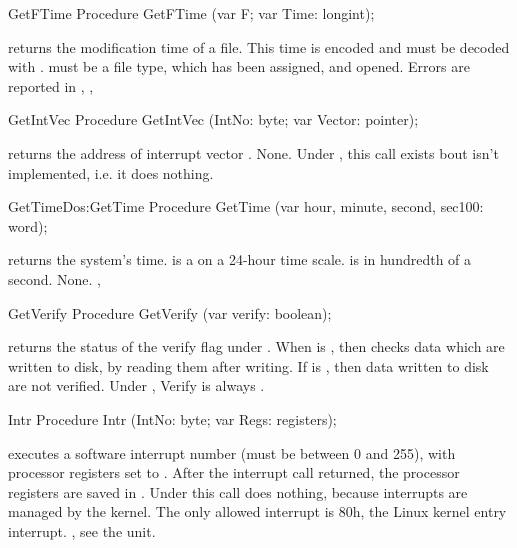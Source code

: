 \latex{}
\html{}
\begin{procedure}{GetFTime}
\Declaration
Procedure GetFTime (var F; var Time: longint);

\Description

 returns the modification time of a file.
This time is encoded and must be decoded with . 
 must be a file type, which has been assigned, and
opened.
\Errors
Errors are reported in 
\SeeAlso
{}, ,
\end{procedure}
\latex{}
\html{}
\begin{procedure}{GetIntVec}
\Declaration
Procedure GetIntVec (IntNo: byte; var Vector: pointer);

\Description

 returns the address of interrupt vector
.
\Errors
None. Under \linux, this call exists bout isn't implemented,
i.e. it does nothing.
\SeeAlso
{}
\end{procedure}
\begin{procedurel}{GetTime}{Dos:GetTime}
\Declaration
Procedure GetTime (var hour, minute, second, sec100: word);

\Description

 returns the system's time.  is a on a 24-hour time
scale.  is in hundredth of a
second.
\Errors
None.
\SeeAlso
{},
\end{procedurel}
\latex{}
\html{}
\begin{procedure}{GetVerify}
\Declaration
Procedure GetVerify (var verify: boolean);

\Description

 returns the status of the verify flag under \dos. When
 is , then \dos checks data which are written to disk,
by reading them after writing. If  is , then data
written to disk are not verified.
\Errors
Under \linux,  Verify is always
.
\SeeAlso
{}
\end{procedure}
\begin{procedure}{Intr}
\Declaration
Procedure Intr (IntNo: byte; var Regs: registers);

\Description

 executes a software interrupt number  (must be between
0 and 255), with processor registers set to . After the interrupt call
returned, the processor registers are saved in .
\Errors
Under \linux this call does nothing, because interrupts are managed by the
kernel. The only allowed interrupt is 80h, the Linux kernel entry interrupt.
\SeeAlso
{}, see the \linux unit.
\end{procedure}
